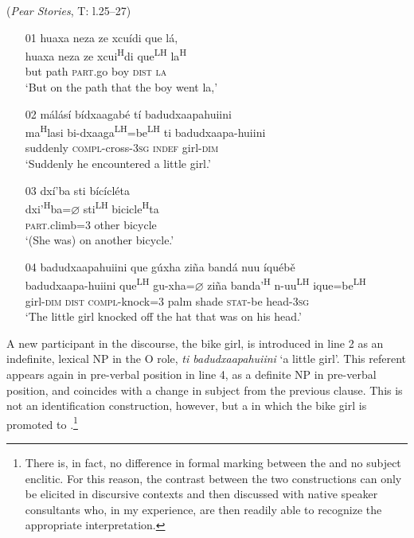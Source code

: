 \ea\label{topicalization1}  (\textit{Pear Stories}, T: l.25--27)
\begin{itemize}
\item[01]
\glll huaxa neza ze xcu\'{i}di que l\'{a},  \\
huaxa neza ze xcui\textsuperscript{H}di que\textsuperscript{LH} la\textsuperscript{H}  \\
but path \textsc{part}.go boy \textsc{dist} \textsc{la}  \\
\glt `But on the path that the boy went la,'


\item[02]
\glll m\'{a}l\'{a}s\'{i} b\'{i}dxaagab\'{e} t\'{i} badudxaapahuiini  \\
ma\textsuperscript{H}lasi bi-dxaaga\textsuperscript{LH}=be\textsuperscript{LH} ti badudxaapa-huiini  \\
suddenly \textsc{compl}-cross-3\textsc{sg} \textsc{indef} girl-\textsc{dim}  \\
\glt `Suddenly he encountered a little girl.'


\item[03]
\glll dx\'{i}'ba sti b\'{i}c\'{i}cl\'{e}ta  \\
dxi'\textsuperscript{H}ba=$\varnothing$ sti\textsuperscript{LH} bicicle\textsuperscript{H}ta  \\
\textsc{part}.climb=\textsc{3} other bicycle  \\
\glt `(She was) on another bicycle.'


\item[04]
\glll badudxaapahuiini que g\'{u}xha zi\~{n}a band\'{a} nuu \'{i}qu\'{e}b\v{e}  \\
badudxaapa-huiini que\textsuperscript{LH} gu-xha=$\varnothing$ zi\~{n}a banda'\textsuperscript{H} n-uu\textsuperscript{LH} ique=be\textsuperscript{LH}  \\
girl-\textsc{dim} \textsc{dist} \textsc{compl}-knock=\textsc{3} palm shade \textsc{stat}-be head-3\textsc{sg}  \\
\glt `The little girl knocked off the hat that was on his head.' 

\end{itemize}
\z
A new participant in the discourse, the bike girl, is introduced in line 2 as an indefinite, lexical NP in the O role, \textit{ti badudxaapahuiini} `a little girl'. This referent appears again in pre-verbal position in line 4, as a definite NP in pre-verbal position, and coincides with a change in subject from the previous clause. This is not an identification construction, however, but a  in which the bike girl is promoted to .\footnote{There is, in fact, no difference in formal marking between the  and no subject enclitic. For this reason, the contrast between the two constructions can only be elicited in discursive contexts and then discussed with native speaker consultants who, in my experience, are then readily able to recognize the appropriate interpretation.} 

